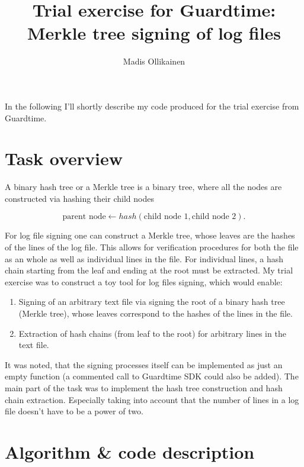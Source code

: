 \documentclass[11pt]{article}
\author{Madis Ollikainen}
\title{Trial exercise for Guardtime: Merkle tree signing of log files}
\begin{document}
\maketitle

In the following I'll shortly describe my code produced for the trial exercise from Guardtime. 

\section*{Task overview} %
\label{sec:task_overview}


A binary hash tree or a Merkle tree is a binary tree, where all the nodes are constructed via hashing their child nodes

\begin{equation}
 \text{parent node} \leftarrow hash( \text{child node 1}, \text{child node 2} ). 	
\end{equation} 

For log file signing one can construct a Merkle tree, whose leaves are the hashes of the lines of the log file. This allows for verification procedures for both the file as an whole as well as individual lines in the file. For individual lines, a hash chain starting from the leaf and ending at the root must be extracted. My trial exercise was to construct a toy tool for log files signing, which would enable:  

\begin{enumerate}
  	\item Signing of an arbitrary text file via signing the root of a binary hash tree (Merkle tree), whose leaves correspond to the hashes of the lines in the file.
  	\item Extraction of hash chains (from leaf to the root) for arbitrary lines in the text file.  
\end{enumerate}  

It was noted, that the signing processes itself can be implemented as just an empty function (a commented call to Guardtime SDK could also be added). The main part of the task was to implement the hash tree construction and hash chain extraction. Especially taking into account that the number of lines in a log file doesn't have to be a power of two. 


\section*{Algorithm \& code description} %
\label{sec:algorithm_description}
\end{document}

